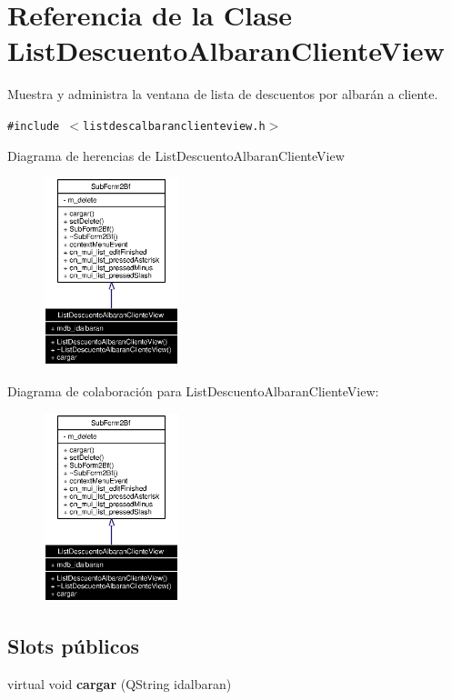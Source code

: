 \section{Referencia de la Clase List\-Descuento\-Albaran\-Cliente\-View}
\label{classListDescuentoAlbaranClienteView}
Muestra y administra la ventana de lista de descuentos por albar\'{a}n a cliente.  


{\tt \#include $<$listdescalbaranclienteview.h$>$}

Diagrama de herencias de List\-Descuento\-Albaran\-Cliente\-View\begin{figure}[H]
\begin{center}
\leavevmode
\includegraphics[width=112pt]{classListDescuentoAlbaranClienteView__inherit__graph}
\end{center}
\end{figure}
Diagrama de colaboraci\'{o}n para List\-Descuento\-Albaran\-Cliente\-View:\begin{figure}[H]
\begin{center}
\leavevmode
\includegraphics[width=112pt]{classListDescuentoAlbaranClienteView__coll__graph}
\end{center}
\end{figure}
\subsection*{Slots p\'{u}blicos}
\begin{CompactItemize}
\item 
virtual void {\bf cargar} (QString idalbaran)\label{classListDescuentoAlbaranClienteView_i0}

\end{CompactItemize}
